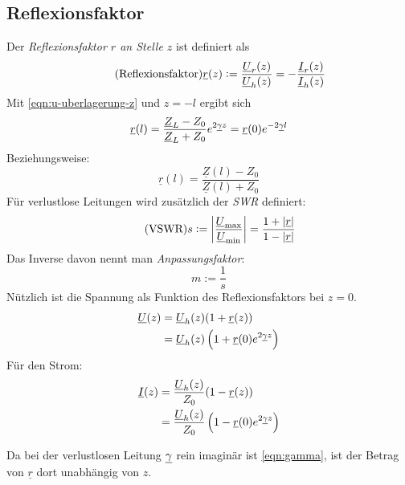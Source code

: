 \subsection{Reflexionsfaktor}
Der \emph{Reflexionsfaktor $r$ an Stelle $z$} ist definiert als
\begin{equation}
    \tag{Reflexionsfaktor}
    \underline{r}(z) := \frac{\underline{U}_r(z)}{\underline{U}_h(z)} = - \frac{\underline{I}_r(z)}{\underline{I}_h(z)}
\end{equation}
Mit \eqref{eqn:u-uberlagerung-z} und $z=-l$ ergibt sich
\begin{equation}
    \underline{r}(l) = \frac{\underline{Z}_L-Z_0}{\underline{Z}_L+Z_0} e^{2\underline{\gamma} z} = \underline{r}(0) e^{-2\underline{\gamma} l}
\end{equation}
Beziehungsweise:
\begin{equation}
   \underline{r}(l) = \frac{\underline{Z}(l)-Z_0}{\underline{Z}(l)+Z_0} 
\end{equation}
\noindent
Für verlustlose Leitungen wird zusätzlich der \emph{SWR} definiert:
\begin{equation}
    \tag{VSWR}
    s := \left| \frac{\underline{U}_\text{max}}{\underline{U}_\text{min}} \right| = \frac{1+|\underline{r}|}{1-|\underline{r}|}
\end{equation}
Das Inverse davon nennt man \emph{Anpassungsfaktor}:
\begin{equation}
    \tag{Anpassungsfaktor}
    m := \frac{1}{s}
\end{equation}
Nützlich ist die Spannung als Funktion des Reflexionsfaktors bei $z=0$.
\begin{equation}
    \begin{aligned}
        \underline{U}(z) &= \underline{U}_h(z)(1+\underline{r}(z))\\
                         &= \underline{U}_h(z)\left(1+\underline{r}(0) e^{2\underline{\gamma} z}\right)
    \end{aligned}
    \label{eqn:u-r}
\end{equation}
Für den Strom:
\begin{equation}
    \begin{aligned}
        \underline{I}(z) &= \frac{\underline{U}_h(z)}{Z_0}(1-\underline{r}(z))\\
                         &= \frac{\underline{U}_h(z)}{Z_0}\left(1-\underline{r}(0) e^{2\underline{\gamma} z}\right)
    \end{aligned}
    \label{eqn:i-r}
\end{equation}

Da bei der verlustlosen Leitung $\underline{\gamma}$ rein imaginär ist \eqref{eqn:gamma}, ist der Betrag von $\underline{r}$ dort unabhängig von $z$.

